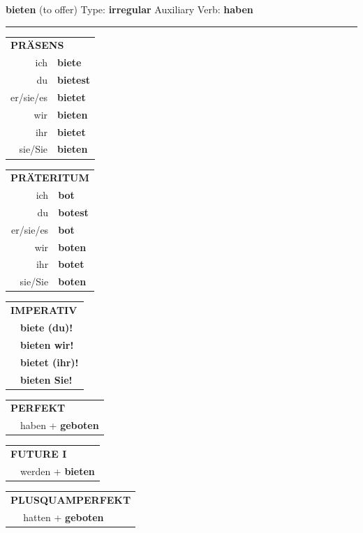 \documentclass[10pt,a4paper]{revtex4-2}
\begin{document}
\begin{verbbox}
{\Large \bf bieten} (to offer) \hfill Type: \textbf{irregular} \hfill Auxiliary Verb: \textbf{haben}

\vspace{5pt}
\hrule
\vspace{5pt}

\begin{tabular}{rl}
\multicolumn{2}{l}{\textbf{PRÄSENS}}\\
ich & \textbf{biete}\\
du & \textbf{bietest}\\
er/sie/es & \textbf{bietet}\\
wir & \textbf{bieten}\\
ihr & \textbf{bietet}\\
sie/Sie & \textbf{bieten}\\
\end{tabular}
\hfill
\begin{tabular}{rl}
\multicolumn{2}{l}{\textbf{PRÄTERITUM}}\\
ich & \textbf{bot}\\
du & \textbf{botest}\\
er/sie/es & \textbf{bot}\\
wir & \textbf{boten}\\
ihr & \textbf{botet}\\
sie/Sie & \textbf{boten}\\
\end{tabular}
\hfill
\begin{tabular}{rl}
\multicolumn{2}{l}{\textbf{IMPERATIV}}\\
& \textbf{biete (du)!}\\
& \textbf{bieten wir!}\\
& \textbf{bietet (ihr)!}\\
& \textbf{bieten Sie!}\\
\end{tabular}

\vspace{10pt}

\begin{tabular}{rl}
\multicolumn{2}{l}{\textbf{PERFEKT}}\\
& haben + \textbf{geboten}\\
\end{tabular}
\hfill
\begin{tabular}{rl}
\multicolumn{2}{l}{\textbf{FUTURE I}}\\
& werden + \textbf{bieten}\\
\end{tabular}
\hfill
\begin{tabular}{rl}
\multicolumn{2}{l}{\textbf{PLUSQUAMPERFEKT}}\\
& hatten + \textbf{geboten}\\
\end{tabular}


\end{verbbox}
\end{document}
